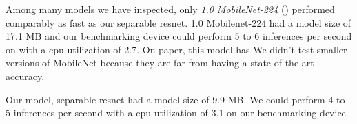 Among many models we have inspected, only \textit{1.0 MobileNet-224} (\cite{howard2017mobilenets}) performed comparably as fast as our separable resnet. 1.0 Mobilenet-224 had a model size of 17.1 MB and our benchmarking device could perform 5 to 6 inferences per second on with a cpu-utilization of 2.7. On paper, this model has  We didn't test smaller versions of MobileNet because they are far from having a state of the art accuracy.

Our model, separable resnet had a model size of 9.9 MB. We could perform 4 to 5 inferences per second with a cpu-utilization of 3.1 on our benchmarking device.





